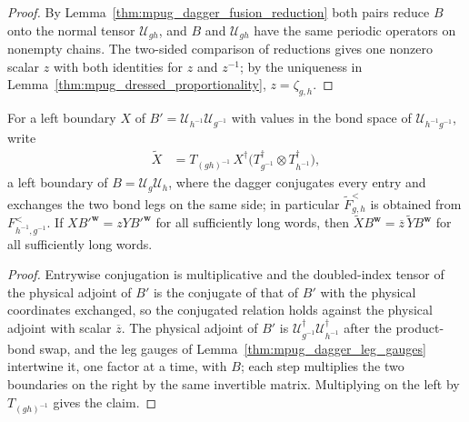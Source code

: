 \begin{proof}\leanok
    By Lemma~\ref{thm:mpug_dagger_fusion_reduction} both pairs reduce $B$
    onto the normal tensor $\mathcal U_{gh}$, and $B$ and $\mathcal U_{gh}$
    have the same periodic operators on nonempty chains. The two-sided
    comparison of reductions gives one nonzero scalar $z$ with both identities
    for $z$ and $z^{-1}$; by the uniqueness in
    Lemma~\ref{thm:mpug_dressed_proportionality}, $z=\zeta_{g,h}$.
\end{proof}

\begin{lemma}
    \label{thm:mpug_dagger_dressed_transport}
    \leanok
    For a left boundary $X$ of $B'=\mathcal U_{h^{-1}}\mathcal U_{g^{-1}}$ with
    values in the bond space of $\mathcal U_{h^{-1}g^{-1}}$, write
    \begin{align}
        \widetilde X & =T_{(gh)^{-1}}\,X^\dagger
        \bigl(T^\dagger_{g^{-1}}\otimes T^\dagger_{h^{-1}}\bigr),
    \end{align}
    a left boundary of $B=\mathcal U_g\mathcal U_h$, where the dagger
    conjugates every entry and exchanges the two bond legs on the same side;
    in particular $\widetilde F^<_{g,h}$ is obtained from $F^<_{h^{-1},g^{-1}}$.
    If $XB'^{\mathbf w}=zYB'^{\mathbf w}$ for all sufficiently long words, then
    $\widetilde XB^{\mathbf w}=\overline z\,\widetilde YB^{\mathbf w}$ for all
    sufficiently long words.
\end{lemma}

\begin{proof}\leanok
    Entrywise conjugation is multiplicative and the doubled-index tensor of
    the physical adjoint of $B'$ is the conjugate of that of $B'$ with the
    physical coordinates exchanged, so the conjugated relation holds against
    the physical adjoint with scalar $\overline z$. The physical adjoint of
    $B'$ is $\mathcal U^\dagger_{g^{-1}}\mathcal U^\dagger_{h^{-1}}$ after the
    product-bond swap, and the leg gauges of
    Lemma~\ref{thm:mpug_dagger_leg_gauges} intertwine it, one factor at a
    time, with $B$; each step multiplies the two boundaries on the right by the
    same invertible matrix. Multiplying on the left by $T_{(gh)^{-1}}$ gives
    the claim.
\end{proof}

